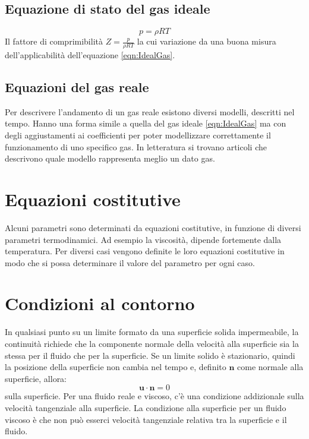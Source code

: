 \subsection{Equazione di stato del gas ideale}
\begin{equation}
p = \rho R T
\label{eqn:IdealGas}
\end{equation}
Il fattore di comprimibilità $Z = \frac{p}{\rho R T}$ la cui variazione da una buona misura dell'applicabilità dell'equazione \eqref{eqn:IdealGas}.

\subsection{Equazioni del gas reale}
Per descrivere l'andamento di un gas reale esistono diversi modelli, descritti nel tempo.
Hanno una forma simile a quella del gas ideale \eqref{eqn:IdealGas} ma con degli aggiustamenti ai coefficienti per poter modellizzare correttamente il funzionamento di uno specifico gas.
In letteratura si trovano articoli che descrivono quale modello rappresenta meglio un dato gas.

\section{Equazioni costitutive}
Alcuni parametri sono determinati da equazioni costitutive, in funzione di diversi parametri termodinamici.
Ad esempio la viscosità, dipende fortemente dalla temperatura.
Per diversi casi vengono definite le loro equazioni costitutive in modo che si possa determinare il valore del parametro per ogni caso.

\section{Condizioni al contorno}
In qualsiasi punto su un limite formato da una superficie solida impermeabile, la continuità richiede che la componente normale della velocità alla superficie sia la stessa per il fluido che per la superficie.
Se un limite solido è stazionario, quindi la posizione della superficie non cambia nel tempo e, definito $\mathbf{n}$ come normale alla superficie, allora:
\begin{equation}
\mathbf{u} \cdot \mathbf{n} = 0 
\end{equation}
sulla superficie.
Per una fluido reale e viscoso, c'è una condizione addizionale sulla velocità tangenziale alla superficie. La condizione alla superficie per un fluido viscoso è che non può esserci velocità tangenziale relativa tra la superficie e il fluido.

